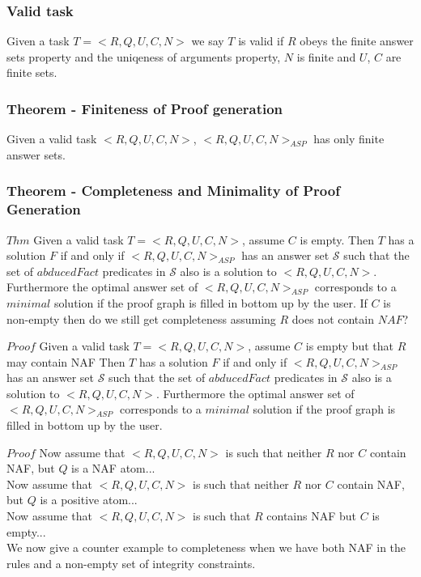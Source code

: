 \documentclass{article}
\begin{document}
\subsubsection{Valid task}
Given a task $T = <R,Q,U,C,N>$ we say $T$ is valid if $R$ obeys the finite answer sets property and the uniqeness of arguments property, $N$ is finite and $U$, $C$ are finite sets. 
\subsubsection{Theorem - Finiteness of Proof generation}
Given a valid task $<R,Q,U,C,N>$, $<R,Q,U,C,N>_{ASP}$ has only finite answer sets. 
\subsubsection{Theorem - Completeness and Minimality of Proof Generation}
$Thm$ Given a valid task $T= <R,Q,U,C,N>$, assume $C$ is empty. Then $T$ has a solution $F$ if and only if $<R,Q,U,C,N>_{ASP}$ has an answer set $\mathcal{S}$ such that the set of $abducedFact$ predicates in $\mathcal{S}$ also is a solution to $<R,Q,U,C,N>$. Furthermore the optimal answer set of $<R,Q,U,C,N>_{ASP}$ corresponds to a $minimal$ solution if the proof graph is filled in bottom up by the user. If $C$ is non-empty then do we still get completeness assuming $R$ does not contain $NAF$?

$Proof$
Given a valid task $T= <R,Q,U,C,N>$, assume $C$ is empty but that $R$ may contain NAF Then $T$ has a solution $F$ if and only if $<R,Q,U,C,N>_{ASP}$ has an answer set $\mathcal{S}$ such that the set of $abducedFact$ predicates in $\mathcal{S}$ also is a solution to $<R,Q,U,C,N>$. Furthermore the optimal answer set of $<R,Q,U,C,N>_{ASP}$ corresponds to a $minimal$ solution if the proof graph is filled in bottom up by the user.

$Proof$ Now assume that $<R,Q,U,C,N>$ is such that neither $R$ nor $C$ contain NAF, but $Q$ is a NAF atom...\\
\newline
Now assume that $<R,Q,U,C,N>$ is such that neither $R$ nor $C$ contain NAF, but $Q$ is a positive atom...\\
\newline
Now assume that $<R,Q,U,C,N>$ is such that $R$ contains NAF but $C$ is empty...\\
\newline
We now give a counter example to completeness when we have both NAF in the rules and a non-empty set of integrity constraints.\\
\end{document}
